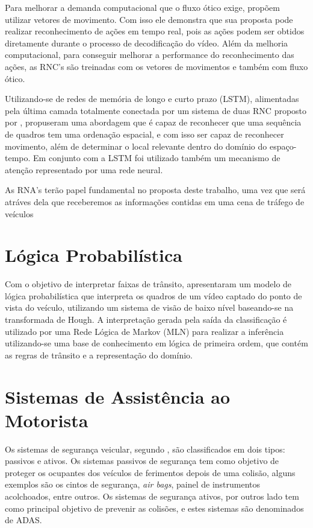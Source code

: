 \documentclass[
	12pt,				%
    oneside,			%
	a4paper,			%
	english,			%
	french,				%
	spanish,			%
	brazil,				%
	]{abntex2}
\begin{document}
Para melhorar a demanda computacional que o fluxo ótico exige,  propõem utilizar vetores de movimento. Com isso ele demonstra que sua proposta pode realizar reconhecimento de ações em tempo real, pois as ações podem ser obtidos diretamente durante o processo de decodificação do vídeo. Além da melhoria computacional, para conseguir melhorar a performance do reconhecimento das ações, as RNC’s são treinadas com os vetores de movimentos e também com fluxo ótico.

Utilizando-se de redes de memória de longo e curto prazo (LSTM), alimentadas pela última camada totalmente conectada por um sistema de duas RNC proposto por ,  propuseram uma abordagem que é capaz de reconhecer que uma sequência de quadros tem uma ordenação espacial, e com isso ser capaz de reconhecer movimento, além de determinar o local relevante dentro do domínio do espaço-tempo. Em conjunto com a LSTM foi utilizado também um mecanismo de atenção representado por uma rede neural.

As RNA's terão papel fundamental no proposta deste trabalho, uma vez que será atráves dela que receberemos as informações contidas em uma cena de tráfego de veículos

\section {Lógica Probabilística}

Com o objetivo de interpretar faixas de trânsito,  apresentaram um modelo de lógica probabilística que interpreta os quadros de um vídeo captado do ponto de vista do veículo, utilizando um sistema de visão de baixo nível baseando-se na transformada de Hough. A interpretação gerada pela saída da classificação é utilizado por uma Rede Lógica de Markov (MLN) para realizar a inferência utilizando-se uma base de conhecimento em lógica de primeira ordem, que contém as regras de trânsito e a representação do domínio. 

\section {Sistemas de Assistência ao Motorista}

Os sistemas de segurança veicular, segundo , são classificados em dois tipos: passivos e ativos. Os sistemas passivos de segurança tem como objetivo de proteger os ocupantes dos veículos de ferimentos depois de uma colisão, alguns exemplos são os cintos de segurança, \textit{air bags}, painel de instrumentos acolchoados, entre outros. Os sistemas de segurança ativos, por outros lado tem como principal objetivo de prevenir as colisões, e estes sistemas são denominados de ADAS.
\end{document}
